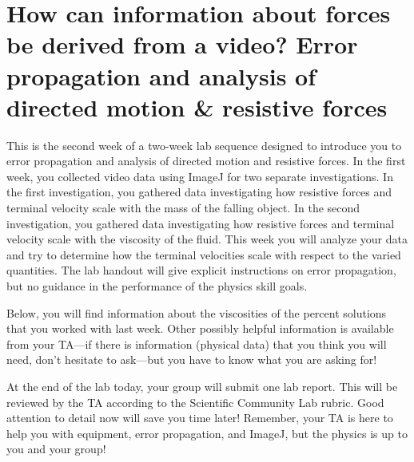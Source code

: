 \section{How can information about forces be derived from a video? Error propagation and analysis of directed motion \& resistive forces}
This is the second week of a two-week lab sequence designed to introduce you to error propagation and analysis of directed motion and resistive forces.
In the first week, you collected video data using ImageJ for two separate investigations.
In the first investigation, you gathered data investigating how resistive forces and terminal velocity scale with the mass of the falling object.
In the second investigation, you gathered data investigating how resistive forces and terminal velocity scale with the viscosity of the fluid.
This week you will analyze your data and try to determine how the terminal velocities scale with respect to the varied quantities.
The lab handout will give explicit instructions on error propagation, but no guidance in the performance of the physics skill goals. \par
Below, you will find information about the viscosities of the percent solutions that you worked with last week.
Other possibly helpful information is available from your TA—if there is information (physical data) that you think you will need, don’t hesitate to ask—but you have to know what you are asking for! \par
At the end of the lab today, your group will submit one lab report.
This will be reviewed by the TA according to the Scientific Community Lab rubric.
Good attention to detail now will save you time later!
Remember, your TA is here to help you with equipment, error propagation, and ImageJ, but the physics is up to you and your group!